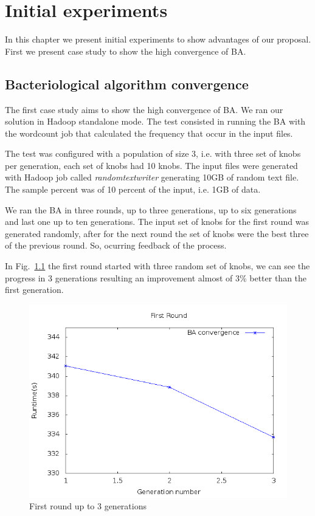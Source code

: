 \chapter{Initial experiments} %
\label{cha:experiments}

In this chapter we present initial experiments to show advantages of our proposal.
First we present case study to show the high convergence of BA.

\section{Bacteriological algorithm convergence}

The first case study aims to show the high convergence of BA. We ran our solution
in Hadoop standalone mode. The test consisted in running the BA with the wordcount job
that calculated the frequency that occur in the input files.

The test was configured with a population of size 3, i.e. with three set of knobs
per generation, each set of knobs had 10 knobs. The input files were generated with
Hadoop job called {\it randomtextwriter} generating 10GB of random text file. The
sample percent was of 10 percent of the input, i.e. 1GB of data.

We ran the BA in three rounds, up to three generations, up to six generations and
last one up to ten generations. The input set of knobs for the first round was
generated randomly, after for the next round the set of knobs were the best three
of the previous round. So, ocurring feedback of the process.

In Fig.~\ref{fig:3gen} the first round started with three random set of knobs, we can
see the progress in 3 generations resulting an improvement almost of 3\% better
than the first generation.
\\
\begin{figure}[htbp]
    \centering
	\includegraphics[scale=0.6]{graphics/img/3gen.png}
    \caption{First round up to 3 generations} \label{fig:3gen}
\end{figure}
\\
\\


